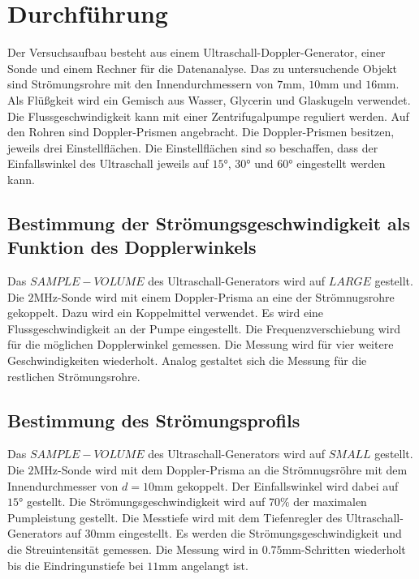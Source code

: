 \section{Durchführung}
\label{sec:Durchführung}
Der Versuchsaufbau besteht aus einem Ultraschall-Doppler-Generator, einer Sonde und einem Rechner für die Datenanalyse.
Das zu untersuchende Objekt sind Strömungsrohre mit den Innendurchmessern von $7\si{\milli\meter}$, $10\si{\milli\meter}$ und $16\si{\milli\meter}$.
Als Flüßgkeit wird ein Gemisch aus Wasser, Glycerin und Glaskugeln verwendet.
Die Flussgeschwindigkeit kann mit einer Zentrifugalpumpe reguliert werden.
Auf den Rohren sind Doppler-Prismen angebracht.
Die Doppler-Prismen besitzen, jeweils drei Einstellflächen.
Die Einstellflächen sind so beschaffen, dass der Einfallswinkel des Ultraschall jeweils auf $15\si{\degree}$, $30\si{\degree}$ und $60\si{\degree}$ eingestellt werden kann.
\subsection{Bestimmung der Strömungsgeschwindigkeit als Funktion des Dopplerwinkels}
Das $SAMPLE-VOLUME$ des Ultraschall-Generators wird auf $LARGE$ gestellt.
Die $2\si{\mega\hertz}$-Sonde wird mit einem Doppler-Prisma an eine der Strömnugsrohre gekoppelt.
Dazu wird ein Koppelmittel verwendet.
Es wird eine Flussgeschwindigkeit an der Pumpe eingestellt.
Die Frequenzverschiebung wird für die möglichen Dopplerwinkel gemessen.
Die Messung wird für vier weitere Geschwindigkeiten wiederholt.
Analog gestaltet sich die Messung für die restlichen Strömungsrohre.
\subsection{Bestimmung des Strömungsprofils}
Das $SAMPLE-VOLUME$ des Ultraschall-Generators wird auf $SMALL$ gestellt.
Die $2\si{\mega\hertz}$-Sonde wird mit dem Doppler-Prisma an die Strömnugsröhre mit dem Innendurchmesser von $d= 10\si{\milli\meter}$ gekoppelt.
Der Einfallswinkel wird dabei auf $15\si{\degree}$ gestellt.
Die Strömungsgeschwindigkeit wird auf $70\%$ der maximalen Pumpleistung gestellt.
Die Messtiefe wird mit dem Tiefenregler des Ultraschall-Generators auf $30\si{\milli\meter}$ eingestellt.
Es werden die Strömungsgeschwindigkeit und die Streuintensität gemessen.
Die Messung wird in $0.75\si{\milli\meter}$-Schritten wiederholt bis die Eindringunstiefe bei $11\si{\milli\meter}$ angelangt ist.
